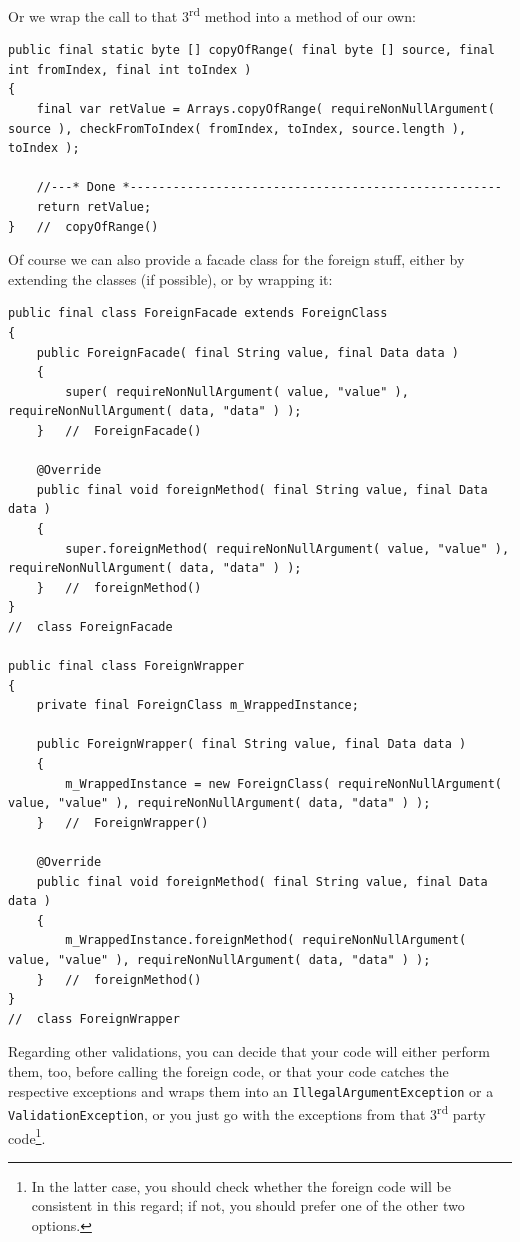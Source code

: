 \documentclass[11pt,a4paper, titlepage, parskip=half, headsepline, footsepline, cleardoublepage=current, headheight=1cm]{scrbook}
\begin{document}
Or we wrap the call to that 3\textsuperscript{rd} method into a method of our own:
\begin{lstlisting}
public final static byte [] copyOfRange( final byte [] source, final int fromIndex, final int toIndex )
{
    final var retValue = Arrays.copyOfRange( requireNonNullArgument( source ), checkFromToIndex( fromIndex, toIndex, source.length ), toIndex );
	 
    //---* Done *----------------------------------------------------
    return retValue;
}   //  copyOfRange()
\end{lstlisting}

Of course we can also provide a facade class for the foreign stuff, either by extending the classes (if possible), or by wrapping it:
\begin{lstlisting}
public final class ForeignFacade extends ForeignClass
{
    public ForeignFacade( final String value, final Data data )
    {
        super( requireNonNullArgument( value, "value" ), requireNonNullArgument( data, "data" ) );
    }   //  ForeignFacade()
    
    @Override
    public final void foreignMethod( final String value, final Data data )
    {
        super.foreignMethod( requireNonNullArgument( value, "value" ), requireNonNullArgument( data, "data" ) );
    }   //  foreignMethod()
}
//  class ForeignFacade

public final class ForeignWrapper
{
    private final ForeignClass m_WrappedInstance;
	
    public ForeignWrapper( final String value, final Data data )
    {
        m_WrappedInstance = new ForeignClass( requireNonNullArgument( value, "value" ), requireNonNullArgument( data, "data" ) );
    }   //  ForeignWrapper()
    
    @Override
    public final void foreignMethod( final String value, final Data data )
    {
        m_WrappedInstance.foreignMethod( requireNonNullArgument( value, "value" ), requireNonNullArgument( data, "data" ) );
    }   //  foreignMethod()
}
//  class ForeignWrapper
\end{lstlisting}

Regarding other validations, you can decide that your code will either perform them, too, before calling the foreign code, or that your code catches the respective exceptions and wraps them into an \lstinline|IllegalArgumentException| or a \lstinline|ValidationException|, or you just go with the exceptions from that 3\textsuperscript{rd} party code\footnote{In the latter case, you should check whether the foreign code will be consistent in this regard; if not, you should prefer one of the other two options.}.
\end{document}
